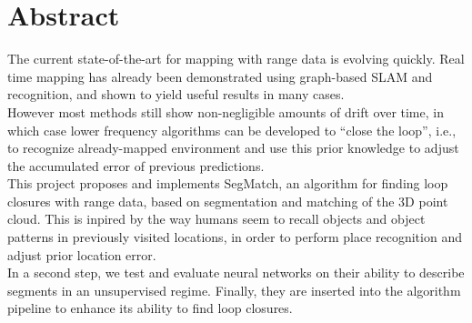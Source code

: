 \chapter*{Abstract}

The current state-of-the-art for mapping with range data is evolving quickly. Real time mapping has already been demonstrated using graph-based SLAM and recognition, and shown to yield useful results in many cases.\\

However most methods still show non-negligible amounts of drift over time, in which case lower frequency algorithms can be developed to “close the loop”, i.e., to recognize already-mapped environment and use this prior knowledge to adjust the accumulated error of previous predictions.\\

This project proposes and implements SegMatch, an algorithm for finding loop closures with range data, based on segmentation and matching of the 3D point cloud. This is inpired by the way humans seem to recall objects and object patterns in previously visited locations, in order to perform place recognition and adjust prior location error.\\ %

In a second step, we test and evaluate neural networks on their ability to describe segments in an unsupervised regime. Finally, they are inserted into the algorithm pipeline to enhance its ability to find loop closures.\\
